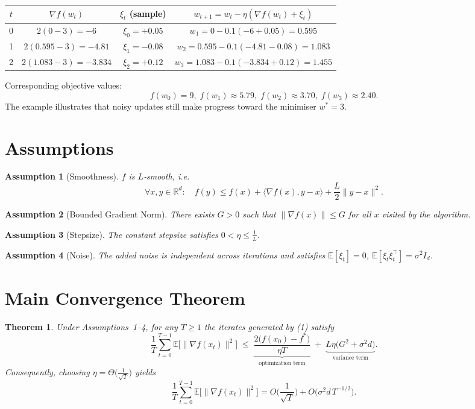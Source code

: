 \documentclass[11pt]{article}
\newtheorem{theorem}{Theorem}
\newtheorem{assumption}{Assumption}
\newcommand{\E}{\mathbb{E}}
\newcommand{\R}{\mathbb{R}}
\begin{document}
\begin{center}
\begin{tabular}{c|c|c|c}
$t$ & $\nabla f(w_t)$ & $\xi_t$ (sample) & $w_{t+1}=w_t-\eta(\nabla f(w_t)+\xi_t)$ \\ \hline
0 & $2(0-3)=-6$ & $\xi_0=+0.05$ & $w_1=0-0.1(-6+0.05)=0.595$ \\
1 & $2(0.595-3)=-4.81$ & $\xi_1=-0.08$ & $w_2=0.595-0.1(-4.81-0.08)=1.083$ \\
2 & $2(1.083-3)=-3.834$ & $\xi_2=+0.12$ & $w_3=1.083-0.1(-3.834+0.12)=1.455$ \\
\end{tabular}
\end{center}
Corresponding objective values:
\[
f(w_0)=9,\; f(w_1)\approx 5.79,\; f(w_2)\approx 3.70,\; f(w_3)\approx 2.40.
\]
The example illustrates that noisy updates still make progress toward the minimiser $w^{*}=3$.

\newpage

\section*{Assumptions}
\begin{assumption}[Smoothness]
$f$ is $L$‑smooth, i.e.
\[
\forall x,y\in\R^{d}:\quad f(y)\le f(x)+\langle\nabla f(x),y-x\rangle+\frac{L}{2}\|y-x\|^{2}.
\tag{2}
\]
\end{assumption}
\begin{assumption}[Bounded Gradient Norm]
There exists $G>0$ such that $\|\nabla f(x)\|\le G$ for all $x$ visited by the algorithm.
\end{assumption}
\begin{assumption}[Stepsize]
The constant stepsize satisfies $0<\eta\le \frac{1}{L}$.
\end{assumption}
\begin{assumption}[Noise]
The added noise is independent across iterations and satisfies $\E[\xi_t]=0$, $\E[\xi_t\xi_t^{\top}]=\sigma^{2}I_{d}$.
\end{assumption}

\section*{Main Convergence Theorem}
\begin{theorem}
\label{thm:main}
Under Assumptions~1–4, for any $T\ge 1$ the iterates generated by (1) satisfy
\[
\frac{1}{T}\sum_{t=0}^{T-1}\E\!\big[\|\nabla f(x_t)\|^{2}\big]
\;\le\;
\underbrace{\frac{2\big(f(x_0)-f^{*}\big)}{\eta T}}_{\text{optimization term}}
\;+\;
\underbrace{L\eta\big(G^{2}+\sigma^{2}d\big)}_{\text{variance term}} .
\tag{6}
\]
Consequently, choosing $\eta = \Theta\!\big(\tfrac{1}{\sqrt{T}}\big)$ yields
\[
\frac{1}{T}\sum_{t=0}^{T-1}\E\!\big[\|\nabla f(x_t)\|^{2}\big]=
O\!\Big(\frac{1}{\sqrt{T}}\Big)+O\!\big(\sigma^{2}d\,T^{-1/2}\big).
\]
\end{theorem}
\end{document}

